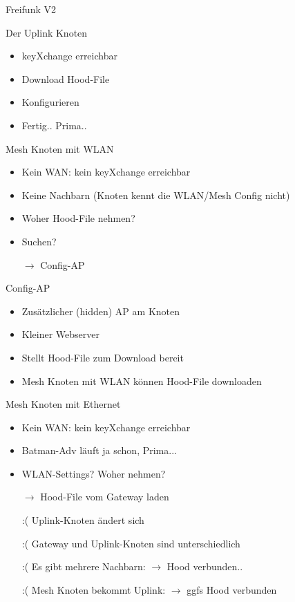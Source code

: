 \begin{frame}{Freifunk V2}
    \center
\end{frame}

\begin{frame}{Der Uplink Knoten}
    \begin{itemize}
        \item keyXchange erreichbar
        \item Download Hood-File
        \item Konfigurieren
        \item Fertig.. Prima..
    \end{itemize}
\end{frame}

\begin{frame}{Mesh Knoten mit WLAN}
    \begin{itemize}
        \item Kein WAN: kein keyXchange erreichbar
        \item Keine Nachbarn (Knoten kennt die WLAN/Mesh Config nicht)
        \item Woher Hood-File nehmen?
        \item Suchen?
        \item[$\rightarrow$] Config-AP
    \end{itemize}
\end{frame}

\begin{frame}{Config-AP}
    \begin{itemize}
        \item Zusätzlicher (hidden) AP am Knoten
        \item Kleiner Webserver
        \item Stellt Hood-File zum Download bereit
        \item Mesh Knoten mit WLAN können Hood-File downloaden
    \end{itemize}
\end{frame}

\begin{frame}{Mesh Knoten mit Ethernet}
    \begin{itemize}
        \item Kein WAN: kein keyXchange erreichbar
        \item Batman-Adv läuft ja schon, Prima...
        \item WLAN-Settings? Woher nehmen?
        \item[$\rightarrow$] Hood-File vom Gateway laden
        \item[:(] Uplink-Knoten ändert sich
        \item[:(] Gateway und Uplink-Knoten sind unterschiedlich
        \item[:(] Es gibt mehrere Nachbarn: $\rightarrow$ Hood verbunden..
        \item[:(] Mesh Knoten bekommt Uplink: $\rightarrow$ ggfs Hood verbunden
    \end{itemize}
\end{frame}

